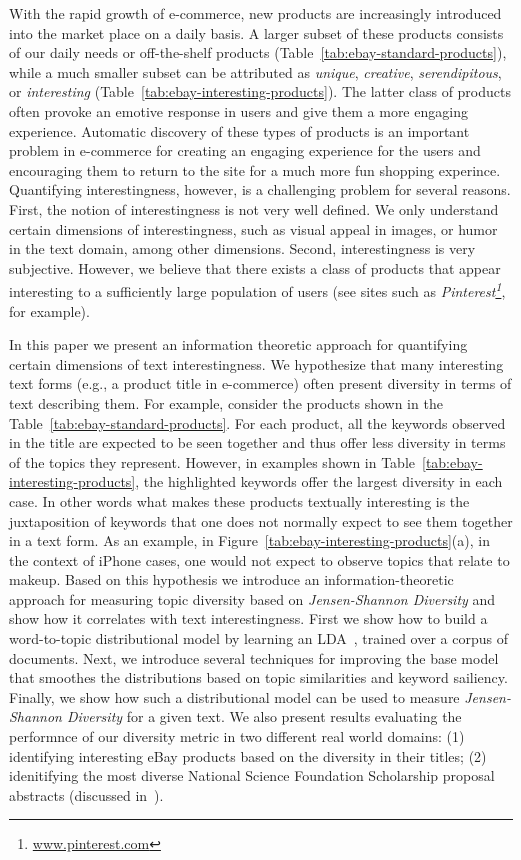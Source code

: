 


With the rapid growth of e-commerce, new products are increasingly introduced into the market place on a daily basis.  A larger subset of these products consists of our daily needs or off-the-shelf products (Table~\ref{tab:ebay-standard-products}), while a much smaller subset can be attributed as {\em unique}, {\em creative}, {\em serendipitous}, or {\em interesting} (Table~\ref{tab:ebay-interesting-products}). The latter class of products often provoke an emotive response in users and give them a more engaging experience. Automatic discovery of these types of products is an important problem in e-commerce for creating an engaging experience for the users and encouraging them to return to the site for a much more fun shopping experince. Quantifying interestingness, however,  is a challenging problem for several reasons. First, the notion of interestingness is not very well defined. We only understand certain dimensions of interestingness, such as visual appeal in images, or humor in the text domain, among other dimensions. Second, interestingness is very subjective. However, we believe that there exists a class of products that appear interesting to a sufficiently large population of users (see sites such as {\em Pinterest\footnote{\url{www.pinterest.com}}}, for example).  

In this paper we present an information theoretic approach for quantifying certain dimensions of text interestingness. We hypothesize that many interesting text forms (e.g., a product title in e-commerce) often present diversity in terms of text describing them. For example, consider the products shown in the Table~\ref{tab:ebay-standard-products}. For each product, all the keywords observed in the title are expected to be seen together and thus offer less diversity in terms of the topics they represent. However, in examples shown in Table~\ref{tab:ebay-interesting-products}, the highlighted keywords 
offer the largest diversity in each case. In other words what makes these products textually interesting is the juxtaposition of keywords that one does not normally expect to see them together in a text form. As an example, in Figure~\ref{tab:ebay-interesting-products}(a), in the context of iPhone cases, one would not expect to observe topics that relate to makeup. Based on this hypothesis we introduce an information-theoretic approach for measuring topic diversity based on {\em Jensen-Shannon Diversity} and show how it correlates with text interestingness. First we show how to build a word-to-topic distributional model by learning an LDA~\cite{Blei:2003:LDA:944919.944937}, trained over a corpus of documents. Next, we introduce several techniques for improving the base model that smoothes the distributions based on topic similarities and keyword sailiency. Finally, we show how such a distributional model can be used to measure {\em Jensen-Shannon Diversity} for a given text. We also present results evaluating the performnce of our diversity metric in two different real world domains: (1) identifying interesting eBay products based on the diversity in their titles; (2) idenitifying the most diverse National Science Foundation Scholarship proposal abstracts (discussed in~\cite{bache:2013}). 

